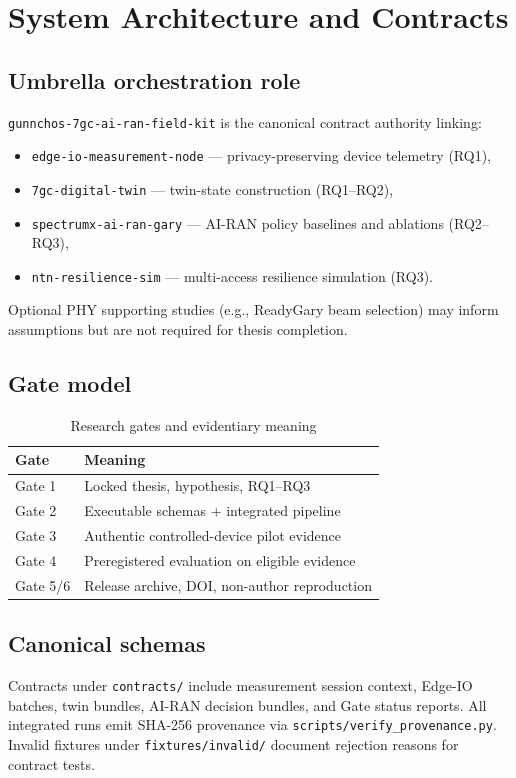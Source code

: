 \section{System Architecture and Contracts}
\label{sec:architecture}

\subsection{Umbrella orchestration role}
\texttt{gunnchos-7gc-ai-ran-field-kit} is the canonical contract authority linking:
\begin{itemize}
  \item \texttt{edge-io-measurement-node} --- privacy-preserving device telemetry (RQ1),
  \item \texttt{7gc-digital-twin} --- twin-state construction (RQ1--RQ2),
  \item \texttt{spectrumx-ai-ran-gary} --- AI-RAN policy baselines and ablations (RQ2--RQ3),
  \item \texttt{ntn-resilience-sim} --- multi-access resilience simulation (RQ3).
\end{itemize}
Optional PHY supporting studies (e.g., ReadyGary beam selection) may inform assumptions but are not required for thesis completion.

\subsection{Gate model}
\begin{table}[t]
\centering
\caption{Research gates and evidentiary meaning}
\label{tab:gates}
\begin{tabular}{ll}
\hline
\textbf{Gate} & \textbf{Meaning} \\
\hline
Gate 1 & Locked thesis, hypothesis, RQ1--RQ3 \\
Gate 2 & Executable schemas + integrated pipeline \\
Gate 3 & Authentic controlled-device pilot evidence \\
Gate 4 & Preregistered evaluation on eligible evidence \\
Gate 5/6 & Release archive, DOI, non-author reproduction \\
\hline
\end{tabular}
\end{table}

\subsection{Canonical schemas}
Contracts under \texttt{contracts/} include measurement session context, Edge-IO batches, twin bundles, AI-RAN decision bundles, and Gate status reports.
All integrated runs emit SHA-256 provenance via \texttt{scripts/verify\_provenance.py}.
Invalid fixtures under \texttt{fixtures/invalid/} document rejection reasons for contract tests.

